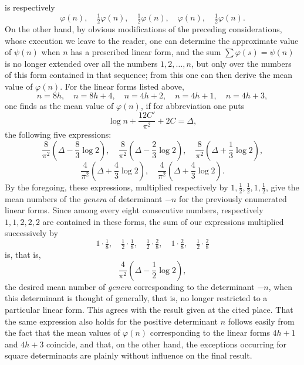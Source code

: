 \documentclass[11pt]{article}
\begin{document}
is respectively
\[
 \varphi(n),\quad \tfrac12\varphi(n),\quad \tfrac12\varphi(n),\quad
 \varphi(n),\quad \tfrac12\varphi(n).
\]
On the other hand, by obvious modifications of the preceding considerations, whose execution we leave to the reader, one can determine the approximate value of $\psi(n)$ when $n$ has a prescribed linear form, and the sum $\sum\varphi(s)=\psi(n)$ is no longer extended over all the numbers $1,2,\ldots,n$, but only over the numbers of this form contained in that sequence; from this one can then derive the mean value of $\varphi(n)$. For the linear forms listed above,
\[
 n=8h,\quad n=8h+4,\quad n=4h+2,\quad n=4h+1,\quad n=4h+3,
\]
one finds as the mean value of $\varphi(n)$, if for abbreviation one puts
\[
 \log n+\frac{12C'}{\pi^2}+2C=\Delta,
\]
the following five expressions:
\[
 \frac8{\pi^2}\left(\Delta-\frac83\log2\right),\quad
 \frac8{\pi^2}\left(\Delta-\frac23\log2\right),\quad
 \frac8{\pi^2}\left(\Delta+\frac13\log2\right),
\]
\[
 \frac4{\pi^2}\left(\Delta+\frac43\log2\right),\quad
 \frac4{\pi^2}\left(\Delta+\frac43\log2\right).
\]
By the foregoing, these expressions, multiplied respectively by $1,\tfrac12,\tfrac12,1,\tfrac12$, give the mean numbers of the \emph{genera} of determinant $-n$ for the previously enumerated linear forms. Since among every eight consecutive numbers, respectively $1,1,2,2,2$ are contained in these forms, the sum of our expressions multiplied successively by
\[
 1\cdot\tfrac18,\quad \tfrac12\cdot\tfrac18,\quad
 \tfrac12\cdot\tfrac28,\quad 1\cdot\tfrac28,\quad
 \tfrac12\cdot\tfrac28
\]
is, that is,
\[
 \frac4{\pi^2}\left(\Delta-\frac12\log2\right),
\]
the desired mean number of \emph{genera} corresponding to the determinant $-n$, when this determinant is thought of generally, that is, no longer restricted to a particular linear form. This agrees with the result given at the cited place. That the same expression also holds for the positive determinant $n$ follows easily from the fact that the mean values of $\varphi(n)$ corresponding to the linear forms $4h+1$ and $4h+3$ coincide, and that, on the other hand, the exceptions occurring for square determinants are plainly without influence on the final result.
\end{document}

